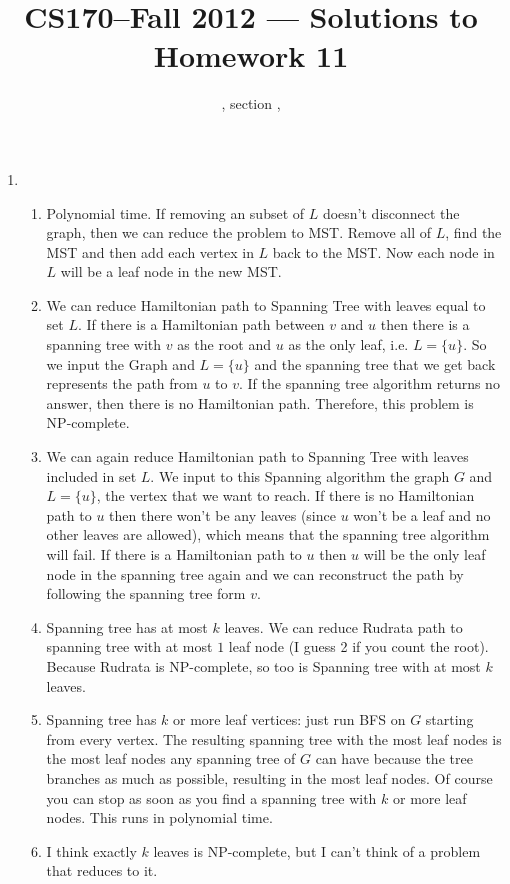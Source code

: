 \documentclass[11pt]{article}
\title{CS170--Fall 2012 --- Solutions to Homework 11}
\author{\Name, section \Sec, \texttt{\Login}}
\begin{document}
\maketitle
\begin{enumerate}
\item
\begin{enumerate}
\item Polynomial time. If removing an subset of $L$ doesn't disconnect the graph, then we can reduce the problem to MST. Remove all of $L$, find the MST and then add each vertex in $L$ back to the MST. Now each node in $L$ will be a leaf node in the new MST.
\item We can reduce Hamiltonian path to Spanning Tree with leaves equal to set $L$. If there is a Hamiltonian path between $v$ and $u$ then there is a spanning tree with $v$ as the root and $u$ as the only leaf, i.e. $L=\{u\}$. So we input the Graph and $L=\{u\}$ and the spanning tree that we get back represents the path from $u$ to $v$. If the spanning tree algorithm returns no answer, then there is no Hamiltonian path. Therefore, this problem is NP-complete.
\item We can again reduce Hamiltonian path to Spanning Tree with leaves included in set $L$. We input to this Spanning algorithm the graph $G$ and $L=\{u\}$, the vertex that we want to reach. If there is no Hamiltonian path to $u$ then there won't be any leaves (since $u$ won't be a leaf and no other leaves are allowed), which means that the spanning tree algorithm will fail. If there is a Hamiltonian path to $u$ then $u$ will be the only leaf node in the spanning tree again and we can reconstruct the path by following the spanning tree form $v$.
\item Spanning tree has at most $k$ leaves. We can reduce Rudrata path to spanning tree with at most $1$ leaf node (I guess 2 if you count the root). Because Rudrata is NP-complete, so too is Spanning tree with at most $k$ leaves.
\item 
Spanning tree has $k$ or more leaf vertices: just run BFS on $G$ starting from every vertex. The resulting spanning tree with the most leaf nodes is the most leaf nodes any spanning tree of $G$ can have because the tree branches as much as possible, resulting in the most leaf nodes. Of course you can stop as soon as you find a spanning tree with $k$ or more leaf nodes. This runs in polynomial time.
\item 
I think exactly $k$ leaves is NP-complete, but I can't think of a problem that reduces to it.
\end{enumerate}
\newpage


\end{enumerate}
\end{document}
